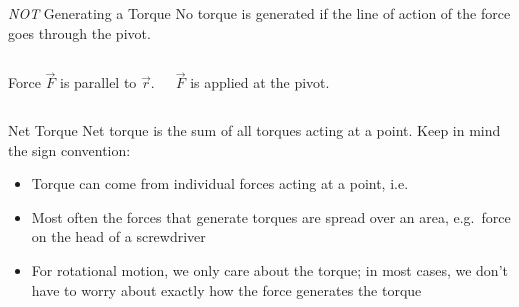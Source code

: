 \documentclass[12pt,compress,aspectratio=169]{beamer}
\begin{document}
\begin{frame}{\emph{NOT} Generating a Torque}
  No torque is generated if the line of action of the force goes through the
  pivot.
  \begin{columns}[T]
    \centering
    \vspace{.45in}

    \vspace{.03in}
    {\footnotesize Force $\vec F$ is parallel to $\vec r$.\par}

    \centering

    {\footnotesize $\vec F$ is applied at the pivot.\par}
  \end{columns}
\end{frame}



\begin{frame}{Net Torque}
  Net torque is the sum of all torques acting at a point. Keep in mind the sign
  convention:

  \begin{itemize}
  \item Torque can come from individual forces acting at a point, i.e.


  \item\vspace{-.15in} Most often the forces that generate torques are spread
    over an area, e.g.\ force on the head of a screwdriver
  \item For rotational motion, we only care about the torque; in most cases, we
    don't have to worry about exactly how the force generates the torque
  \end{itemize}
\end{frame}
\end{document}
